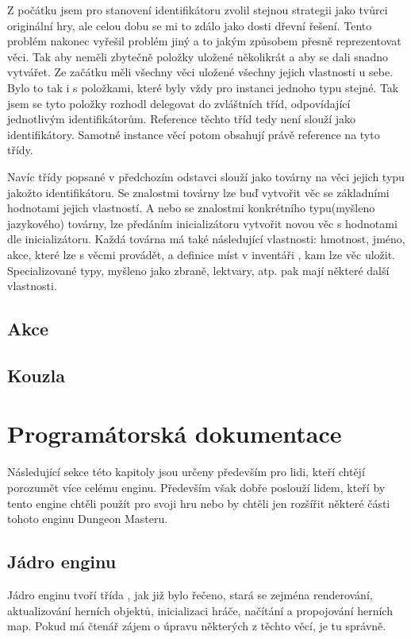 Z počátku jsem pro stanovení identifikátoru zvolil stejnou strategii jako tvůrci originální hry, ale celou dobu se mi 
to zdálo jako dosti dřevní řešení. Tento problém nakonec vyřešil problém jiný a to jakým způsobem přesně reprezentovat věci. Tak aby neměli zbytečně
položky uložené několikrát a aby se dali snadno vytvářet. Ze začátku měli všechny věci uložené 
všechny jejich vlastnosti u sebe. Bylo to tak i s položkami, které byly vždy pro instanci jednoho typu stejné. Tak jsem se
tyto položky rozhodl delegovat do zvláštních tříd, odpovídající jednotlivým identifikátorům. Reference těchto tříd
tedy není slouží jako identifikátory. Samotné instance věcí potom obsahují právě reference na tyto třídy.

Navíc třídy popsané v předchozím odstavci slouží jako továrny na věci jejich typu jakožto identifikátoru. Se znalostmi továrny lze buď
vytvořit věc se základními hodnotami jejich vlastností. A nebo se znalostmi konkrétního typu(myšleno jazykového) továrny, lze předáním inicializátoru vytvořit novou věc
s hodnotami dle inicializátoru. Každá továrna má také následující vlastnosti: hmotnost, jméno, akce, které lze s věcmi provádět, a definice míst v inventáři
, kam lze věc uložit. Specializované typy, myšleno jako zbraně, lektvary, atp. pak mají některé další vlastnosti.

\section{Akce}

\section{Kouzla}

\chapter{Programátorská dokumentace}
Následující sekce této kapitoly jsou určeny především pro lidi, kteří chtějí porozumět více celému enginu. Především
však dobře poslouží lidem, kteří by tento engine chtěli použít pro svoji hru nebo by chtěli jen rozšířit některé části
tohoto enginu Dungeon Masteru.

\section{Jádro enginu}
Jádro enginu tvoří třída , jak již bylo řečeno, stará se zejména renderování, aktualizování herních objektů,
inicializaci hráče, načítání a propojování herních map. Pokud má čtenář zájem o úpravu některých z těchto věcí, je tu správně.

